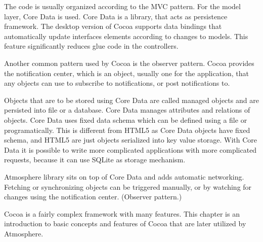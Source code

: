 The code is usually organized according to the MVC pattern. For the model layer, Core Data is used. Core Data is a library, that acts as persistence framework. The desktop version of Cocoa supports data bindings that automatically update interfaces elements according to changes to models. This feature significantly reduces glue code in the controllers.

Another common pattern used by Cocoa is the observer pattern. Cocoa provides the notification center, which is an object, usually one for the application, that any objects can use to subscribe to notifications, or post notifications to. 

Objects that are to be stored using Core Data are called managed objects and are persisted into file or a database. Core Data manages attributes and relations of objects. Core Data uses fixed data schema which can be defined using a file or programatically. This is different from HTML5 as Core Data objects have fixed schema, and HTML5 are just objects serialized into key value storage. With Core Data it is possible to write more complicated applications with more complicated requests, because it can use SQLite as storage mechanism.

Atmosphere library sits on top of Core Data and adds automatic networking. Fetching or synchronizing objects can be triggered manually, or by watching  for changes using the notification center. (Observer pattern.)

Cocoa is a fairly complex framework with many features. This chapter is an introduction to basic concepts and features of Cocoa that are later utilized by Atmosphere. 